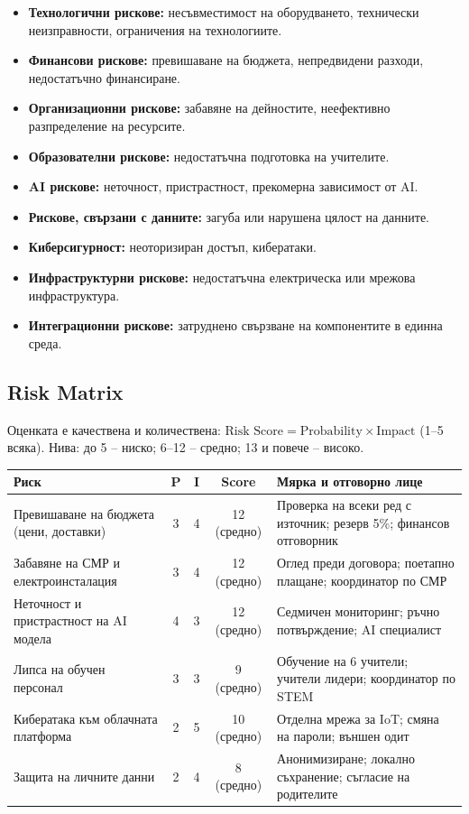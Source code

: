 \documentclass[11pt,a4paper]{article}
\begin{document}
\begin{itemize}
  \item \textbf{Технологични рискове:} несъвместимост на оборудването, технически неизправности, ограничения на технологиите.
  \item \textbf{Финансови рискове:} превишаване на бюджета, непредвидени разходи, недостатъчно финансиране.
  \item \textbf{Организационни рискове:} забавяне на дейностите, неефективно разпределение на ресурсите.
  \item \textbf{Образователни рискове:} недостатъчна подготовка на учителите.
  \item \textbf{AI рискове:} неточност, пристрастност, прекомерна зависимост от AI.
  \item \textbf{Рискове, свързани с данните:} загуба или нарушена цялост на данните.
  \item \textbf{Киберсигурност:} неоторизиран достъп, кибератаки.
  \item \textbf{Инфраструктурни рискове:} недостатъчна електрическа или мрежова инфраструктура.
  \item \textbf{Интеграционни рискове:} затруднено свързване на компонентите в единна среда.
\end{itemize}

\subsection{Risk Matrix}

Оценката е качествена и количествена: $\text{Risk Score} = \text{Probability} \times \text{Impact}$ (1--5 всяка). Нива: до 5 -- ниско; 6--12 -- средно; 13 и повече -- високо.

\begin{table}[h]
\centering
\small
\begin{tabularx}{\textwidth}{@{}>{\raggedright\arraybackslash}p{5.6cm}cccX@{}}
\toprule
Риск & P & I & Score & Мярка и отговорно лице \\
\midrule
Превишаване на бюджета (цени, доставки) & 3 & 4 & 12 (средно) & Проверка на всеки ред с източник; резерв 5\%; финансов отговорник \\
Забавяне на СМР и електроинсталация & 3 & 4 & 12 (средно) & Оглед преди договора; поетапно плащане; координатор по СМР \\
Неточност и пристрастност на AI модела & 4 & 3 & 12 (средно) & Седмичен мониторинг; ръчно потвърждение; AI специалист \\
Липса на обучен персонал & 3 & 3 & 9 (средно) & Обучение на 6 учители; учители лидери; координатор по STEM \\
Кибератака към облачната платформа & 2 & 5 & 10 (средно) & Отделна мрежа за IoT; смяна на пароли; външен одит \\
Защита на личните данни & 2 & 4 & 8 (средно) & Анонимизиране; локално съхранение; съгласие на родителите \\
\bottomrule
\end{tabularx}
\end{table}
\end{document}
